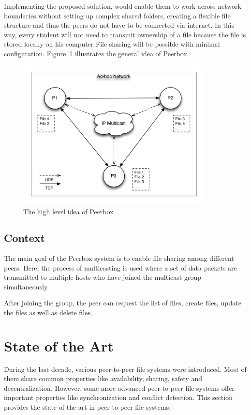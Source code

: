 Implementing the proposed solution, would  enable them to work across network boundaries without setting up complex shared folders, creating a flexible file structure and thus the peers do not have to be connected via internet. In this way, every student will not need to transmit ownership of a file because the file is stored locally on his computer File sharing will be possible with minimal configuration. Figure~\ref{fig:idea} illustrates the general idea of Peerbox.

 
\begin{figure}[H]
\begin{center}
\includegraphics[height=3in]{figures/idea.pdf}
\caption{The high level idea of Peerbox}
\label{fig:idea}
\end{center}
\end{figure}



\subsection{Context}
The main goal of the Peerbox system is to enable file sharing among different peers. Here, the process of multicasting is used where a set of data packets are transmitted to  multiple hosts who have joined the multicast group simultaneously. 

After joining the group, the peer can request the list of files, create files, update the files as well as delete files.



\section{State of the Art}

During the last decade, various peer-to-peer file systems were introduced. Most of them share common properties like availability, sharing, safety and decentralization. However, some more advanced peer-to-peer file systems offer important properties like synchronization and conflict detection. This section provides the state of the art in peer-to-peer file systems.

